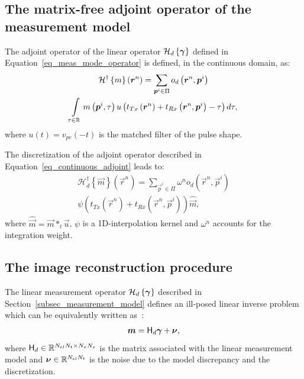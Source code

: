\documentclass[conference]{IEEEtran}
\begin{document}
\subsection{The matrix-free adjoint operator of the measurement model}
\label{subsec_adjoint_measurement_model}
The adjoint operator of the linear operator $\mathcal{H}_d \left\lbrace \bm{\gamma} \right\rbrace$ defined in Equation~\eqref{eq_meas_mode_operator} is defined, in the continuous domain, as:
\begin{multline}
\label{eq_continuous_adjoint}
\mathcal{H}^\dagger \left\lbrace m \right\rbrace \left(\bm{r}^n\right) = \sum \limits_{\bm{p}^i \in \Pi} o_d \left(\bm{r}^n, \bm{p}^i\right) \\ \int \limits_{\tau \in \mathbb{R}} m \left(\bm{p}^i, \tau \right) u\left( t_{Tx} \left(\bm{r}^n\right) + t_{Rx} \left( \bm{r}^n, \bm{p}^i \right) - \tau\right) d\tau,
\end{multline}
where $u\left(t\right) = v_{pe} \left(-t\right)$ is the matched filter of the pulse shape.

The discretization of the adjoint operator described in Equation~\eqref{eq_continuous_adjoint} leads to:
\begin{multline}
	\label{eq_adjoint_discrete}
	\mathcal{H}_d^\dagger \left\lbrace\vec{m}\right\rbrace \left(\vec{r}^n\right) = \sum \limits_{\vec{p}^i \in \Pi} \omega^n o_d \left(\vec{r}^n, \vec{p}^i\right) \\ \psi \left(t_{Tx}\left(\vec{r}^n\right) + t_{Rx} \left( \vec{r}^n, \vec{p}^i \right) \right) \hat{\vec{m}},
\end{multline}
where $\hat{\vec{m}} = \vec{m} \ast_t \vec{u}$, $\psi$ is a \num{1}D-interpolation kernel and $\omega^n$ accounts for the integration weight. 
\subsection{The image reconstruction procedure}
\label{subsec_image_recons_process}
The linear measurement operator $\mathcal{H}_d\left\lbrace \bm{\gamma} \right\rbrace$ described in Section~\ref{subsec_measurement_model} defines an ill-posed linear inverse problem which can be equivalently written as~\cite{Besson_UFFC_2017}:
\begin{align}
	\bm{m} = \mathsf{H}_d \bm{\gamma} + \bm{\nu},
\end{align}
where $\mathsf{H}_d \in \mathbb{R}^{N_{el}N_t \times N_xN_z}$ is the matrix associated with the linear measurement model and $\bm{\nu} \in \mathbb{R}^{N_{el}N_t}$ is the noise due to the model discrepancy and the discretization.
\end{document}
